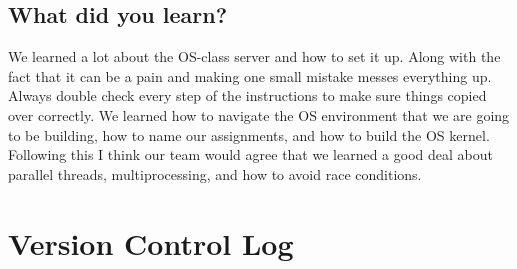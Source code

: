 \documentclass{article}
\begin{document}
\subsection*{What did you learn?}
We learned a lot about the OS-class server and how to set it up. 
Along with the fact that it can be a pain and making one small mistake messes everything up. 
Always double check every step of the instructions to make sure things copied over correctly. 
We learned how to navigate the OS environment that we are going to be building, how to name our assignments, and how to build the OS kernel. 
Following this I think our team would agree that we learned a good deal about parallel threads, multiprocessing, and how to avoid race conditions.

\section*{Version Control Log}
\end{document}
